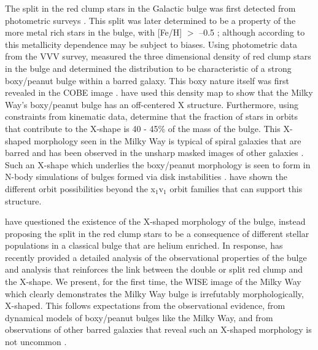 \documentclass[12pt, preprint]{aastex}
\begin{document}
%
The split in the red clump stars in the Galactic bulge was first detected from photometric surveys \citep{McWilliam2010, Nataf2010}. This split was later determined to be a property of the more metal rich stars in the bulge, with [Fe/H] $>$ --0.5 \citep{Ness2012, Uttenthaler2012}; although according to \citet{Nataf2014} this metallicity dependence may be subject to biases. Using photometric data from the VVV survey, \citet{Wegg2013} measured the three dimensional density of red clump stars in the bulge and determined the distribution to be characteristic of a strong boxy/peanut bulge within a barred galaxy. This boxy nature itself was first revealed in the COBE image \citep{Dwek1995}. \citet{Portail2015a} have used this density map to show that the Milky Way's boxy/peanut bulge has an off-centered X structure. Furthermore, using constraints from kinematic data, \citet{Portail2015b}  determine that the fraction of stars in orbits that contribute to the X-shape is 40 - 45\% of the mass of the bulge. This X-shaped morphology seen in the Milky Way is typical of spiral galaxies that are barred and has been observed in the unsharp masked images of other galaxies \citep[e.g.][]{Bureau2006}. Such an X-shape which underlies the boxy/peanut morphology is seen to form in N-body simulations of bulges formed via disk instabilities \citep[e.g.][]{Athanassoula2005, Debattista2006, Inma2006}. \citet{Portail2015b} have shown the different orbit possibilities beyond the x$_{1}$v$_{1}$ orbit families \citep[e.g.][]{P1991} that can support this structure.



\citet{Lee2015} have questioned the existence of the X-shaped morphology of the bulge, instead proposing the split in the red clump stars to be a consequence of different stellar populations in a classical bulge that are helium enriched. In response, \citet{Gonzalez2015} has recently provided a detailed analysis of the observational properties of the bulge and analysis that reinforces the link between the double or split red clump and the X-shape. We present, for the first time, the WISE image of the Milky Way \citep{Lang2014a} which clearly demonstrates the Milky Way bulge is irrefutably morphologically, X-shaped. This follows expectations from the observational evidence,  from dynamical models of boxy/peanut bulges like the Milky Way, and from observations of other barred galaxies that reveal such an X-shaped morphology is not uncommon \citep{L2014}. 
\end{document}
